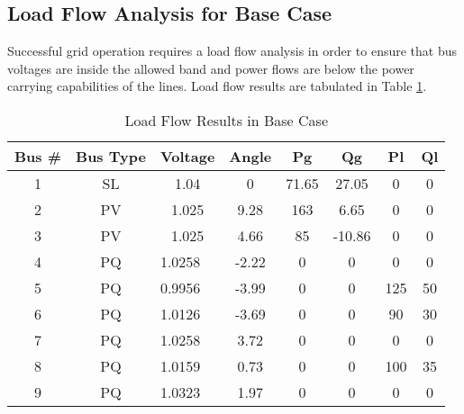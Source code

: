 \subsection{Load Flow Analysis for Base Case}
Successful grid operation requires a load flow analysis in order to ensure that bus voltages are inside the allowed band and power flows are below the power carrying capabilities of the lines. Load flow results are tabulated in Table \ref{loadflow_case1}.
\begin{table}[h!]
	\centering
	\begin{tabular}{cclccccc}
		\hline
		Bus \# & Bus Type & \multicolumn{1}{c}{Voltage} & Angle & Pg    & Qg     & Pl  & Ql \\ \hline
		1      & SL       & \multicolumn{1}{c}{1.04}    & 0     & 71.65 & 27.05  & 0   & 0  \\
		2      & PV       & \multicolumn{1}{c}{1.025}   & 9.28  & 163   & 6.65   & 0   & 0  \\
		3      & PV       & \multicolumn{1}{c}{1.025}   & 4.66  & 85    & -10.86 & 0   & 0  \\
		4      & PQ       & 1.0258                      & -2.22 & 0     & 0      & 0   & 0  \\
		5      & PQ       & 0.9956                      & -3.99 & 0     & 0      & 125 & 50 \\
		6      & PQ       & 1.0126                      & -3.69 & 0     & 0      & 90  & 30 \\
		7      & PQ       & 1.0258                      & 3.72  & 0     & 0      & 0   & 0  \\
		8      & PQ       & 1.0159                      & 0.73  & 0     & 0      & 100 & 35 \\
		9      & PQ       & 1.0323                      & 1.97  & 0     & 0      & 0   & 0  \\ \hline
	\end{tabular}
	\caption{Load Flow Results in Base Case}
	\label{loadflow_case1}
\end{table}
